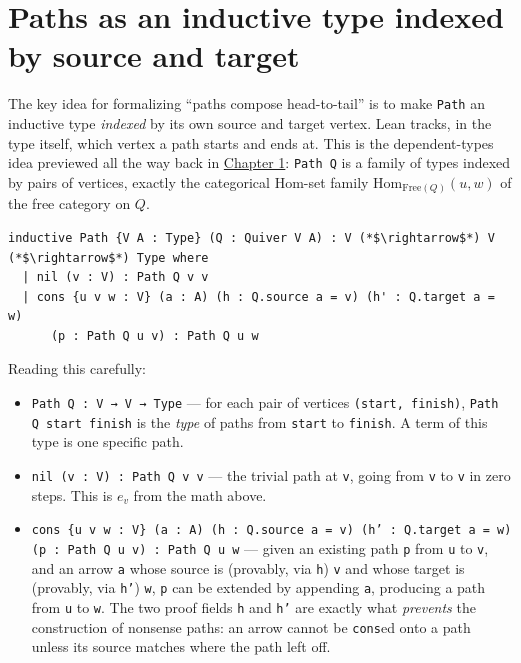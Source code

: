 \section{Paths as an inductive type indexed by source and target}\label{sec:11-path-algebras:04-paths-as-inductive-type:1}

The key idea for formalizing ``paths compose head-to-tail'' is to make \texttt{Path} an inductive type \emph{indexed} by its own source and target vertex. Lean tracks, in the type itself, which vertex a path starts and ends at. This is the dependent-types idea previewed all the way back in \hyperref[sec:01-basics:03-dependent-types:1]{Chapter 1}: \texttt{Path Q} is a family of types indexed by pairs of vertices, exactly the categorical \(\mathrm{Hom}\)-set family \(\mathrm{Hom}_{\mathrm{Free}(Q)}(u,w)\) of the free category on \(Q\).

\begin{lstlisting}
inductive Path {V A : Type} (Q : Quiver V A) : V (*$\rightarrow$*) V (*$\rightarrow$*) Type where
  | nil (v : V) : Path Q v v
  | cons {u v w : V} (a : A) (h : Q.source a = v) (h' : Q.target a = w)
      (p : Path Q u v) : Path Q u w
\end{lstlisting}

Reading this carefully:

\begin{itemize}
\tightlist
\item
  \texttt{Path Q : V → V → Type} --- for each pair of vertices \texttt{(start, finish)}, \texttt{Path Q start finish} is the \emph{type} of paths from \texttt{start} to \texttt{finish}. A term of this type is one specific path.
\item
  \texttt{nil (v : V) : Path Q v v} --- the trivial path at \texttt{v}, going from \texttt{v} to \texttt{v} in zero steps. This is \(e_v\) from the math above.
\item
  \texttt{cons \{u v w : V\} (a : A) (h : Q.source a = v) (h' : Q.target a = w) (p : Path Q u v) : Path Q u w} --- given an existing path \texttt{p} from \texttt{u} to \texttt{v}, and an arrow \texttt{a} whose source is (provably, via \texttt{h}) \texttt{v} and whose target is (provably, via \texttt{h'}) \texttt{w}, \texttt{p} can be extended by appending \texttt{a}, producing a path from \texttt{u} to \texttt{w}. The two proof fields \texttt{h} and \texttt{h'} are exactly what \emph{prevents} the construction of nonsense paths: an arrow cannot be \texttt{cons}ed onto a path unless its source matches where the path left off.
\end{itemize}

